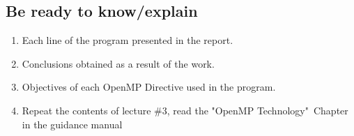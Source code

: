 { %
	\subsection{Be ready to know/explain}
	\begin{enumerate}
		\item Each line of the program presented in the report.
		\item Conclusions obtained as a result of the work.
		\item Objectives of each OpenMP Directive used in the program.
		\item Repeat the contents of lecture \#3, read the "OpenMP Technology"\ Chapter in the guidance manual
	\end{enumerate}
}